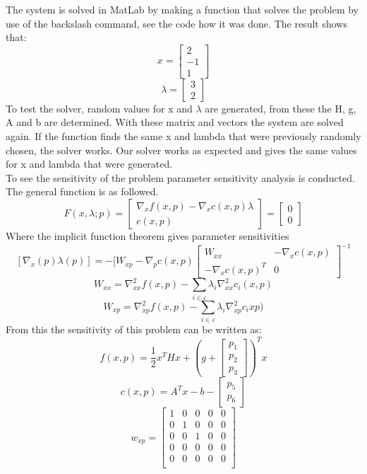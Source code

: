 The system is solved in MatLab by making a function that solves the problem by use of the backslash command, see the code how it was done. The result shows that:
\[x=\begin{bmatrix}
	2 \\ -1 \\ 1
\end{bmatrix}\]
\[\lambda=\begin{bmatrix}
	3 \\ 2 
\end{bmatrix}\]
To test the solver, random values for x and $\lambda$ are generated, from these the H, g, A and b are determined. With these matrix and vectors the system are solved again. If the function finds the same x and lambda that were previously randomly chosen, the solver works. Our solver works as expected and gives the same values for x and lambda that were generated.\\
To see the sensitivity of the problem parameter sensitivity analysis is conducted. The general function is as followed. 
\[F(x,\lambda;p)= \begin{bmatrix}
	\nabla_x f(x,p)- \nabla_x c(x,p)\lambda \\ c(x,p)
\end{bmatrix}=\begin{bmatrix}
0 \\ 0
\end{bmatrix}\]
Where the implicit function theorem gives parameter sensitivities
\[[\nabla_x(p) \lambda(p)]=-[W_{xp} -\nabla_p c(x,p)\begin{bmatrix}
W_{xx} & -\nabla_x c(x,p) \\ -\nabla_x c(x,p)^T & 0
\end{bmatrix}^{-1}\]
\[ W_{xx} = \nabla^2_{xx} f(x,p) - \sum\limits_{i\in\varepsilon} \lambda_i\nabla^2_{xx}c_i(x,p)\]
\[ W_{xp} = \nabla^2_{xp} f(x,p) - \sum\limits_{i\in\varepsilon} \lambda_i\nabla^2_{xp}c_i{xp})\]
From this the sensitivity of this problem can be written as:
\[f(x,p) = \dfrac{1}{2}x^T Hx+(g+\begin{bmatrix} p_1 \\ p_2 \\ p_3 \end{bmatrix})^T x\]
\[c(x,p)=A^Tx-b-\begin{bmatrix} p_5 \\ p_6\end{bmatrix}\]
\[w_{xp}=\begin{bmatrix}
1&0&0&0&0\\0&1&0&0&0\\0&0&1&0&0\\0&0&0&0&0\\0&0&0&0&0\\\end{bmatrix}\]
